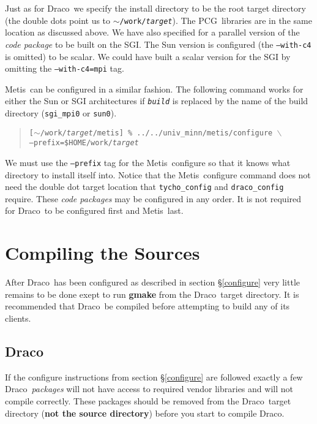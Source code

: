 \documentclass[11pt]{nmemo}
\newcommand{\comp}[1]{\normalfont\footnotesize\texttt{#1}\normalsize}
\newcommand{\draco}{{\normalfont\sffamily Draco}}
\newcommand{\metis}{{\normalfont\sffamily Metis}}
\newcommand{\pcg}{{\normalfont\sffamily PCG}}
\begin{document}
Just as for \draco\ we specify the install directory to be the root
target directory (the double dots point us to
\comp{$\sim$/work/\emph{target}}).  The \pcg\ libraries are in the
same location as discussed above.  We have also specified for a
parallel version of the \emph{code package} to be built on the SGI.
The Sun version is configured (the \comp{--with-c4} is omitted) to be
scalar.  We could have built a scalar version for the SGI by omitting
the \comp{--with-c4=mpi} tag.

\metis\ can be configured in a similar fashion.  The following command
works for either the Sun or SGI architectures if \comp{\emph{build}}
is replaced by the name of the build directory (\comp{sgi\_mpi0} or
\comp{sun0}).

\footnotesize
\begin{verse}
\texttt{[$\sim$/work/\emph{target}/metis] \%
../../univ\_minn/metis/configure $\backslash$\\
\hspace{0.5in}--prefix=\${HOME}/work/\emph{target}}
\end{verse}
\normalsize

We must use the \comp{--prefix} tag for the \metis\ configure so that
it knows what directory to install itself into.  Notice that the
\metis\ configure command does not need the double dot target location
that \comp{tycho\_config} and \comp{draco\_config} require.  These
\emph{code packages} may be configured in any order.  It is not
required for \draco\ to be configured first and \metis\ last.


\section{Compiling the Sources}
\label{compile}

After \draco\ has been configured as described in section
\S\ref{configure} very little remains to be done exept to run
\textbf{gmake} from the \draco\ target directory.  It is recommended
that \draco\ be compiled before attempting to build any of its
clients. 

\subsection{\draco}

If the configure instructions from section \S\ref{configure} are
followed exactly a few \draco\ \emph{packages} will not have access to
required vendor libraries and will not compile correctly.  These
packages should be removed from the \draco\ target directory
(\textbf{not the source directory}) before you start to compile
\draco.
\end{document}
